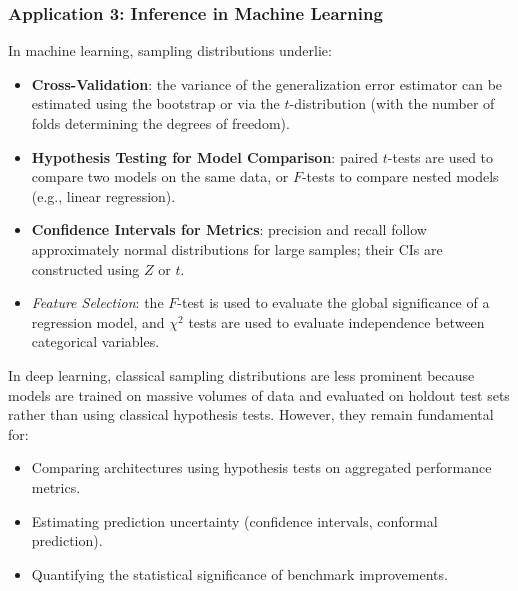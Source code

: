 

\subsubsection{Application 3: Inference in Machine Learning}

In machine learning, sampling distributions underlie:

\begin{itemize}
 \item \textbf{Cross-Validation}: the variance of the generalization error estimator can be estimated using the bootstrap or via the $t$-distribution (with the number of folds determining the degrees of freedom).
 \item \textbf{Hypothesis Testing for Model Comparison}: paired $t$-tests are used to compare two models on the same data, or $F$-tests to compare nested models (e.g., linear regression).
 \item \textbf{Confidence Intervals for Metrics}: precision and recall follow approximately normal distributions for large samples; their CIs are constructed using $Z$ or $t$.
 \item \emph{Feature Selection}: the $F$-test is used to evaluate the global significance of a regression model, and $\chi^2$ tests are used to evaluate independence between categorical variables.
\end{itemize}

\begin{observacion}
In deep learning, classical sampling distributions are less prominent because models are trained on massive volumes of data and evaluated on holdout test sets rather than using classical hypothesis tests. However, they remain fundamental for:
\begin{itemize}
 \item Comparing architectures using hypothesis tests on aggregated performance metrics.
 \item Estimating prediction uncertainty (confidence intervals, conformal prediction).
 \item Quantifying the statistical significance of benchmark improvements.
\end{itemize}
\end{observacion}
